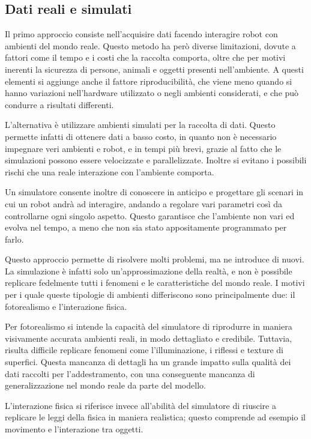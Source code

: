 \documentclass[12pt]{report}
\begin{document}
\subsection{Dati reali e simulati}
\label{sec:dati_reali_e_simulati}

Il primo approccio consiste nell'acquisire dati facendo interagire robot con ambienti del mondo reale. Questo metodo ha però diverse limitazioni, dovute a fattori come il tempo e i costi che la raccolta comporta, oltre che per motivi inerenti la sicurezza di persone, animali e oggetti presenti nell'ambiente. A questi elementi si aggiunge anche il fattore riproducibilità, che viene meno quando si hanno variazioni nell'hardware utilizzato o negli ambienti considerati, e che può condurre a risultati differenti.

L'alternativa è utilizzare ambienti simulati per la raccolta di dati. Questo permette infatti di ottenere dati a basso costo, in quanto non è necessario impegnare veri ambienti e robot, e in tempi più brevi, grazie al fatto che le simulazioni possono essere velocizzate e parallelizzate. Inoltre si evitano i possibili rischi che una reale interazione con l'ambiente comporta.

Un simulatore consente inoltre di conoscere in anticipo e progettare gli scenari in cui un robot andrà ad interagire, andando a regolare vari parametri così da controllarne ogni singolo aspetto. Questo garantisce che l'ambiente non vari ed evolva nel tempo, a meno che non sia stato appositamente programmato per farlo.

Questo approccio permette di risolvere molti problemi, ma ne introduce di nuovi. La simulazione è infatti solo un'approssimazione della realtà, e non è possibile replicare fedelmente tutti i fenomeni e le caratteristiche del mondo reale. I motivi per i quale queste tipologie di ambienti differiscono sono principalmente due: il fotorealismo e l'interazione fisica.

Per fotorealismo si intende la capacità del simulatore di riprodurre in maniera visivamente accurata ambienti reali, in modo dettagliato e credibile. Tuttavia, risulta difficile replicare fenomeni come l'illuminazione, i riflessi e texture di superfici. Questa mancanza di dettagli ha un grande impatto sulla qualità dei dati raccolti per l'addestramento, con una conseguente mancanza di generalizzazione nel mondo reale da parte del modello.

L'interazione fisica si riferisce invece all'abilità del simulatore di riuscire a replicare le leggi della fisica in maniera realistica; questo comprende ad esempio il movimento e l'interazione tra oggetti. 
\end{document}
